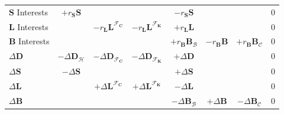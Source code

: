 \documentclass[a4paper, headings=standardclasses]{scrartcl}
\begin{document}
{\begin{tabularx}{\textwidth}{@{} Y|cccccc|l @{}}
        \midrule
        $\mathbf{S}$ Interests & $+r_{\mathbf{S}} \mathbf{S}$             &                                                            &                                                                        & $-r_{\mathbf{S}} \mathbf{S}$           &                                          &                                        & 0                                 \\
        $\mathbf{L}$ Interests &                                          & $-r_{\mathbf{L}} \mathbf{L}^{\mathcal{F}_{\mathbf{C}}}$    & $-r_{\mathbf{L}} \mathbf{L}^{\mathcal{F}_{\mathbf{K}}}$                & $+r_{\mathbf{L}} \mathbf{L}$           &                                          &                                        & 0                                 \\
        $\mathbf{B}$ Interests &                                          &                                                            &                                                                        & $+r_\mathbf{B} \mathbf{B}_\mathcal{B}$ & $-r_\mathbf{B} \mathbf{B}$               & $+r_\mathbf{B} \mathbf{B}_\mathcal{C}$ & 0                                 \\
        \midrule
        $\Delta\mathbf{D}$     & $-\Delta\mathbf{D}_\mathcal{H}$          & $-\Delta\mathbf{D}_{\mathcal{F}_{\mathbf{C}}}$             & $-\Delta\mathbf{D}_{\mathcal{F}_{\mathbf{K}}}$                         & $+\Delta\mathbf{D}$                    &                                          &                                        & 0                                 \\
        $\Delta\mathbf{S}$     & $-\Delta\mathbf{S}$                      &                                                            &                                                                        & $+\Delta\mathbf{S}$                    &                                          &                                        & 0                                 \\
        $\Delta\mathbf{L}$     &                                          & $+\Delta\mathbf{L}^{\mathcal{F}_{\mathbf{C}}}$             & $+\Delta\mathbf{L}^{\mathcal{F}_{\mathbf{K}}}$                         & $-\Delta\mathbf{L}$                    &                                          &                                        & 0                                 \\
        $\Delta\mathbf{B}$     &                                          &                                                            &                                                                        & $-\Delta\mathbf{B}_\mathcal{B}$        & $+\Delta\mathbf{B}$                      & $-\Delta\mathbf{B}_\mathcal{C}$        & 0                                 \\

\end{tabularx}}
\end{document}
